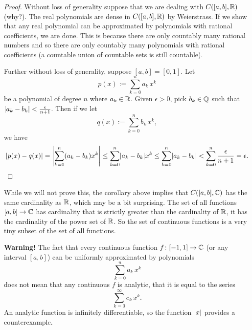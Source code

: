 \begin{proof}
Without loss of generality suppose that we are dealing with $C([a,b],{\mathbb{R}})$
(why?).
The real polynomials are dense in $C([a,b],{\mathbb{R}})$ by Weierstrass.  If we show that
any real polynomial can be approximated by polynomials with rational
coefficients, we are done.  This is because there are only countably many
rational numbers and so there are only countably many polynomials with
rational coefficients (a countable union of countable sets is still
countable).

Further without loss of generality, suppose $[a,b]=[0,1]$.  Let
\begin{equation*}
p(x) := \sum_{k=0}^n a_k\,  x^k
\end{equation*}
be a polynomial of degree $n$ where $a_k \in {\mathbb{R}}$.  Given $\epsilon > 0$, pick $b_k \in {\mathbb{Q}}$
such that $\lvert {a_k-b_k} \rvert < \frac{\epsilon}{n+1}$.  Then
if we let
\begin{equation*}
q(x) := \sum_{k=0}^n b_k \, x^k ,
\end{equation*}
we have
\begin{equation*}
\lvert {p(x)-q(x)} \rvert
=
\left\lvert {\sum_{k=0}^n (a_k-b_k) x^k} \right\rvert
\leq
\sum_{k=0}^n \lvert {a_k-b_k} \rvert x^k
\leq
\sum_{k=0}^n \lvert {a_k-b_k} \rvert
<
\sum_{k=0}^n \frac{\epsilon}{n+1} = \epsilon . \qedhere
\end{equation*}
\end{proof}

\begin{remark}
While we will not prove this, the corollary above implies that
$C([a,b],{\mathbb{C}})$ has the same cardinality as ${\mathbb{R}}$, which may be a
bit surprising.  The set of all functions $[a,b] \to {\mathbb{C}}$ has
cardinality that is strictly greater than the cardinality of ${\mathbb{R}}$, it has the
cardinality of the power set of ${\mathbb{R}}$.  So the
set of continuous functions is a very tiny subset of the set of all
functions.
\end{remark}

\textbf{Warning!}
The fact that every continuous function $f \colon [-1,1] \to {\mathbb{C}}$ (or any
interval $[a,b]$) can be uniformly
approximated by polynomials
\begin{equation*}
\sum_{k=0}^n a_k\,  x^k
\end{equation*}
does not mean that any continuous $f$ is analytic, that it is equal to the
series
\begin{equation*}
\sum_{k=0}^\infty c_k\,  x^k .
\end{equation*}
An analytic function is infinitely differentiable, so the function
$\lvert {x} \rvert$ provides a counterexample.

